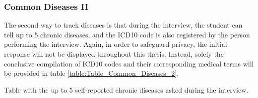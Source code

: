 \subsubsection{Common Diseases II}

The second way to track diseases is that during the interview, the student can tell up to 5 chronic diseases, and the ICD10 code is also registered by the person performing the interview. Again, in order to safeguard privacy, the initial response will not be displayed throughout this thesis. Instead, solely the conclusive compilation of ICD10 codes and their corresponding medical terms will be provided in table \ref{table:Table_Common_Diseases_2}.


\begin{table}[H]

    \caption{Table with the up to 5 self-reported chronic diseases asked during the interview.}

	\tiny

	\centering

    \label{table:Table_Common_Diseases_2}
    

\end{table}
